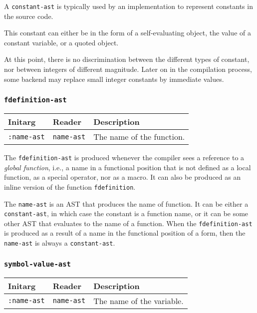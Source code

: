 A \texttt{constant-ast} is typically used by an implementation to
represent constants in the source code.

This constant can either be in the form of a self-evaluating object,
the value of a constant variable, or a quoted object.

At this point, there is no discrimination between the different types
of constant, nor between integers of different magnitude.  Later on
in the compilation process, some backend may replace small integer
constants by immediate values.

\subsubsection{\texttt{fdefinition-ast}}
\label{fdefinition-ast}

\begin{tabular}{|l|l|l|}
\hline
Initarg & Reader & Description\\
\hline\hline
\texttt{:name-ast} & \texttt{name-ast} & The name of the function.\\
\hline
\end{tabular}

The \texttt{fdefinition-ast} is produced whenever the compiler sees a
reference to a \emph{global function}, i.e., a name in a functional
position that is not defined as a local function, as a special
operator, nor as a macro.  It can also be produced as an inline
version of the function \texttt{fdefinition}.

The \texttt{name-ast} is an AST that produces the name of function.
It can be either a \texttt{constant-ast}, in which case the constant
is a function name, or it can be some other AST that evaluates to the
name of a function.  When the \texttt{fdefinition-ast} is produced as
a result of a name in the functional position of a form, then the
\texttt{name-ast} is always a \texttt{constant-ast}.

\subsubsection{\texttt{symbol-value-ast}}
\label{symbol-value-ast}

\begin{tabular}{|l|l|l|}
\hline
Initarg & Reader & Description\\
\hline\hline
\texttt{:name-ast} & \texttt{name-ast} & The name of the variable.\\
\hline
\end{tabular}

